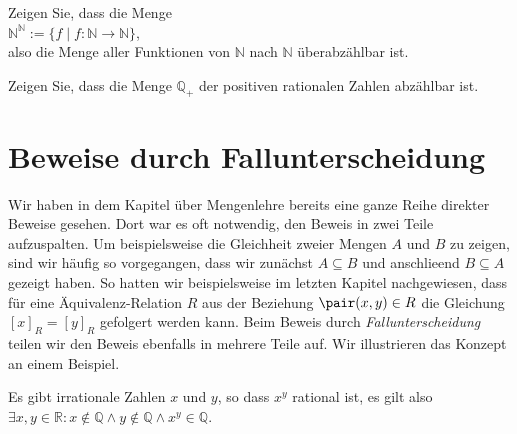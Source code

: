 \exercise
Zeigen Sie, dass die Menge
\\[0.2cm]
\hspace*{1.3cm}
$\mathbb{N}^\mathbb{N} := \{ f \mid f: \mathbb{N} \rightarrow \mathbb{N} \}$,
\\[0.2cm]
also die Menge aller Funktionen von $\mathbb{N}$ nach $\mathbb{N}$ \"{u}berabz\"{a}hlbar ist.
\exend

\exercise
Zeigen Sie, dass die Menge $\mathbb{Q}_+$ der positiven rationalen Zahlen abz\"{a}hlbar ist.
\exend

\section{Beweise durch Fallunterscheidung}
Wir haben in dem Kapitel \"{u}ber Mengenlehre bereits eine ganze Reihe direkter Beweise gesehen.
Dort war es oft notwendig, den Beweis in zwei Teile aufzuspalten.
Um beispielsweise die Gleichheit zweier Mengen $A$ und $B$ zu zeigen, sind wir 
h\"{a}ufig so vorgegangen, dass wir zun\"{a}chst 
$A \subseteq B$ und anschlie\3end $B \subseteq A$ gezeigt haben.  So hatten wir beispielsweise  im
letzten Kapitel nachgewiesen, dass f\"{u}r eine \"{A}quivalenz-Relation $R$ aus der Beziehung $\pair(x,y) \in R$ die
Gleichung $[x]_R = [y]_R$ gefolgert werden kann.  Beim Beweis durch \emph{Fallunterscheidung} teilen
wir den Beweis ebenfalls in mehrere Teile auf.  Wir illustrieren das Konzept an einem Beispiel.

\begin{Satz}
  Es gibt irrationale Zahlen $x$ und $y$, so dass $x^y$ rational ist, es gilt also
  \\[0.2cm]
  \hspace*{1.3cm}
  $\exists x, y \in \mathbb{R}: x \not\in \mathbb{Q} \wedge y \not\in \mathbb{Q} \wedge x^y \in \mathbb{Q}$.
\end{Satz}

